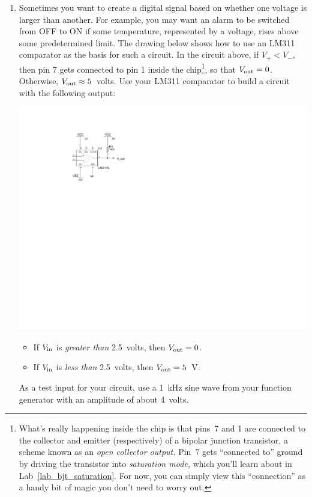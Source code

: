 \begin{enumerate}[wide]

\item \label{part_comparator} Sometimes you want to create a digital signal based on whether one voltage is larger than another.  For example, you may want an alarm to be switched from OFF to ON if some temperature, represented by a voltage, rises above some predetermined limit. The drawing below shows how to use an LM311 comparator as the basis for such a circuit.  
In the circuit above, if $V_+<V_-$, then pin 7 gets connected to pin 1 inside the chip\footnote{What's really happening inside the chip is that pins~7 and 1 are connected to the collector and emitter (respectively) of a bipolar junction transistor, a scheme known as an \textit{open collector output.}  Pin~7 gets ``connected to'' ground by driving the transistor into \textit{saturation mode,} which you'll learn about in Lab~\ref{lab_bjt_saturation}.  For now, you can simply view this ``connection'' as a handy bit of magic you don't need to worry out.}, so that $V_{\rm out}=0$.  Otherwise, $V_{\rm out} \approx 5$~volts.  Use your LM311 comparator to build a circuit with the following output: 
\begin{center}
\includegraphics{digital_electronics/basic_lm311.pdf}
\end{center}


\begin{itemize}[nosep]
\item If $V_{\rm in}$ is \textit{greater than} 2.5~volts, then $V_{\rm out}=0$.
\item If $V_{\rm in}$ is \textit{less than} 2.5~volts, then $V_{\rm out}=5$~V.
\end{itemize}
As a test input for your circuit, use a 1~kHz sine wave from your function generator with an amplitude of about 4~volts.



\end{enumerate}
